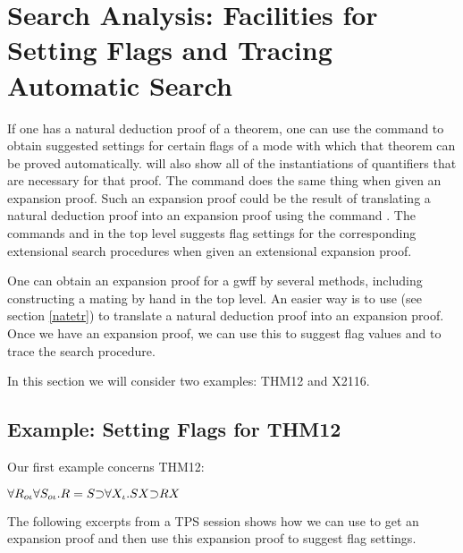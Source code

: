 \section{Search Analysis: Facilities for Setting Flags and Tracing Automatic Search}\label{searchanalysis}

If one has a natural deduction proof of a theorem, one can use the
command  to obtain suggested settings for certain flags of
a mode with which that theorem can be proved automatically.
 will also show all of the instantiations of quantifiers
that are necessary for that proof.  The command  does
the same thing when given an expansion proof. Such an expansion proof
could be the result of translating a natural deduction proof into an
expansion proof using the command .
The commands  and  
in the  top level
suggests flag settings for the corresponding extensional search
procedures when given an extensional expansion proof.

One can obtain an expansion proof for a gwff by several methods,
including constructing a mating by hand
in the  top level.
An easier way is to use  (see section \ref{natetr})
to translate a natural deduction proof into an expansion proof.
Once we have an expansion proof, we can use this to suggest
flag values and to trace the  search procedure.

In this section we will consider two examples: THM12
and X2116.

\subsection{Example: Setting Flags for THM12}\label{THM12-NAT-ETREE}

Our first example concerns THM12:

$\forall R _{o\iota}   \forall S _{o\iota} .R = S \mathord{\supset}  \forall X _{\iota} .S X \mathord{\supset} R X$

The following excerpts from a TPS session shows how we can
use  to get an expansion proof
and then use this expansion proof to suggest flag settings.


